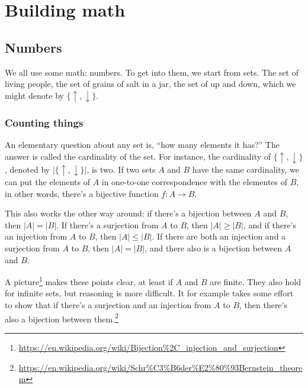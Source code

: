 \documentclass[11pt,oneside,%
]{memoir}
\theoremstyle{definition}
\newcommand{\NN}{\mathbb{N}}
\newcommand{\RR}{\mathbb{R}}
\newcommand{\CC}{\mathbb{C}}
\newcommand{\ZZ}{\mathbb{Z}}
\newcommand{\QQ}{\mathbb{Q}}
\begin{document}
\part{Building math}

\chapter{Numbers}

We all use some math: numbers. To get into them, we start from sets. The set of living people, the set of grains of salt in a jar, the set of up and down, which we might denote by \(\lbrace\uparrow,\downarrow\rbrace\). %

\section{Counting things}

An elementary question about any set is, ``how many elements it has?'' The answer is called the cardinality of the set. For instance, the cardinality of \(\lbrace\uparrow,\downarrow\rbrace\), denoted by \(|\lbrace\uparrow,\downarrow\rbrace|\), is two. If two sets \(A\) and \(B\) have the same cardinality, we can put the elements of \(A\) in one-to-one correspondence with the elementes of \(B\), in other words, there's a bijective function \(f:A\rightarrow B\). %

This also works the other way around: if there's a bijection between \(A\) and \(B\), then \(|A|=|B|\). If there's a surjection from \(A\) to \(B\), then \(|A|\geq|B|\), and if there's an injection from \(A\) to \(B\), then \(|A|\leq|B|\). If there are both an injection and a surjection from \(A\) to \(B\), then \(|A|=|B|\), and there also is a bijection between \(A\) and \(B\).

A picture\footnote{\url{https://en.wikipedia.org/wiki/Bijection\%2C_injection_and_surjection}} makes these points clear, at least if \(A\) and \(B\) are finite. They also hold for infinite sets, but reasoning is more difficult. It for example takes some effort to show that if there's a surjection and an injection from \(A\) to \(B\), then there's also a bijection between them.\footnote{\url{https://en.wikipedia.org/wiki/Schr\%C3\%B6der\%E2\%80\%93Bernstein_theorem}}
\end{document}
